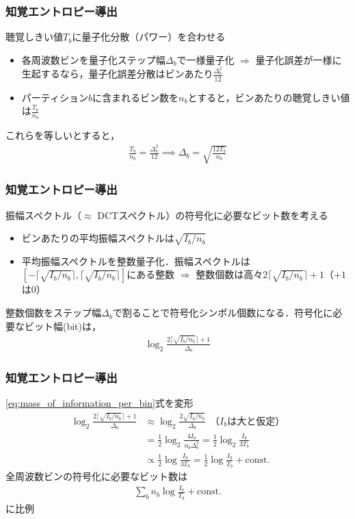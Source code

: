 \documentclass[14pt,xcolor=dvipsnames,table,dvipdfmx]{beamer}
\begin{document}
\begin{frame}[c]
    \frametitle{知覚エントロピー導出}
    聴覚しきい値$T_{b}$に量子化分散（パワー）を合わせる
    \begin{itemize}
        \item 各周波数ビンを量子化ステップ幅$\Delta_{b}$で一様量子化 $\Rightarrow$ 量子化誤差が一様に生起するなら，量子化誤差分散はビンあたり$\frac{\Delta_{b}^{2}}{12}$
        \item パーティション$b$に含まれるビン数を$n_{b}$とすると，ビンあたりの聴覚しきい値は$\frac{T_{b}}{n_{b}}$
    \end{itemize}
    これらを等しいとすると，
    \begin{align}
        \frac{T_{b}}{n_{b}} = \frac{\Delta_{b}^{2}}{12} \implies \Delta_{b} = \sqrt{\frac{12T_{b}}{n_{b}}}
    \end{align}
\end{frame}

\begin{frame}[c]
    \frametitle{知覚エントロピー導出}
    振幅スペクトル（$\approx$ DCTスペクトル）の符号化に必要なビット数を考える
    \begin{itemize}
        \item ビンあたりの平均振幅スペクトルは$\sqrt{I_{b} / n_{b}}$
        \item 平均振幅スペクトルを整数量子化．振幅スペクトルは$[- \lceil \sqrt{I_{b} / n_{b}} \rceil, \lceil \sqrt{I_{b} / n_{b}} \rceil]$にある整数 $\Rightarrow$ 整数個数は高々$2 \lceil \sqrt{I_{b} / n_{b}} \rceil + 1$（$+1$は$0$）
    \end{itemize}
    整数個数をステップ幅$\Delta_{b}$で割ることで符号化シンボル個数になる．符号化に必要なビット幅(bit)は，
    \begin{align}
        \log_{2} \frac{2 \lceil \sqrt{I_{b} / n_{b}} \rceil + 1}{\Delta_{b}} \label{eq:mass_of_information_per_bin}
    \end{align}
\end{frame}

\begin{frame}[c]
    \frametitle{知覚エントロピー導出}
    \eqref{eq:mass_of_information_per_bin}式を変形
    \begin{align*}
        \log_{2} \frac{2 \lceil \sqrt{I_{b} / n_{b}} \rceil + 1}{\Delta_{b}} &\approx \log_{2} \frac{2 \sqrt{I_{b} / n_{b}}}{\Delta_{b}} \ \ \text{（$I_{b}$は大と仮定）} \\
        &= \frac{1}{2} \log_{2} \frac{4 I_{b}}{n_{b} \Delta_{b}^{2}} = \frac{1}{2} \log_{2} \frac{I_{b}}{3T_{b}} \\
        &\propto \frac{1}{2} \log \frac{I_{b}}{3T_{b}} = \frac{1}{2} \log \frac{I_{b}}{T_{b}} + \mathrm{const.}
    \end{align*}
    全周波数ビンの符号化に必要なビット数は
    \begin{align}
        \sum_{b} n_{b} \log \frac{I_{b}}{T_{b}} + \mathrm{const.}
    \end{align}
    に比例
\end{frame}
\end{document}
